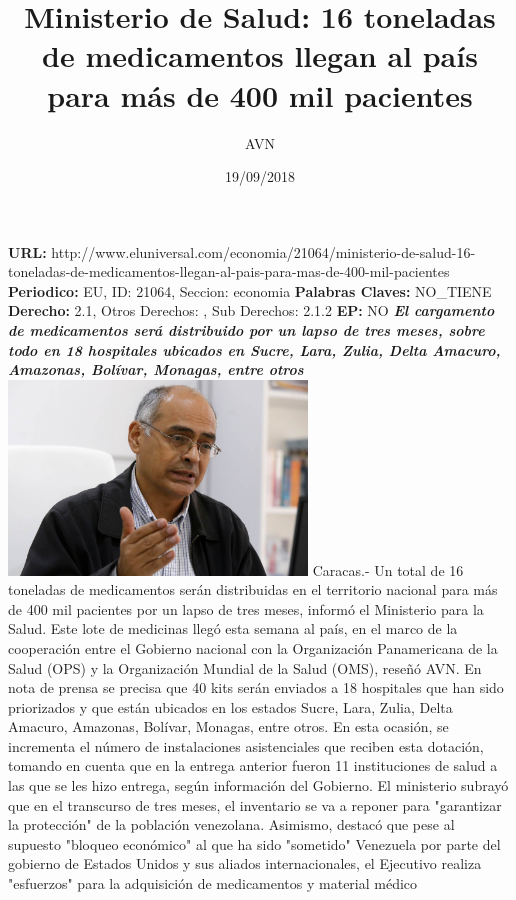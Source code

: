 \documentclass{article}%
\title{\textbf{Ministerio de Salud: 16 toneladas de medicamentos llegan al país para más de 400 mil pacientes}}%
\author{AVN}%
\date{19/09/2018}%
\begin{document}
%
\normalsize%
\maketitle%
\textbf{URL: }%
http://www.eluniversal.com/economia/21064/ministerio{-}de{-}salud{-}16{-}toneladas{-}de{-}medicamentos{-}llegan{-}al{-}pais{-}para{-}mas{-}de{-}400{-}mil{-}pacientes\newline%
%
\textbf{Periodico: }%
EU, %
ID: %
21064, %
Seccion: %
economia\newline%
%
\textbf{Palabras Claves: }%
NO\_TIENE\newline%
%
\textbf{Derecho: }%
2.1, %
Otros Derechos: %
, %
Sub Derechos: %
2.1.2\newline%
%
\textbf{EP: }%
NO\newline%
\newline%
%
\textbf{\textit{El cargamento de medicamentos será distribuido por un lapso de tres meses, sobre todo en 18 hospitales ubicados en Sucre, Lara, Zulia, Delta Amacuro, Amazonas, Bolívar, Monagas, entre otros}}%
\newline%
\newline%
%
\includegraphics[width=300px]{51.jpg}%
\newline%
%
Caracas.{-} Un total de 16 toneladas de medicamentos serán distribuidas en el territorio nacional para más de 400 mil pacientes por un lapso de tres meses, informó el Ministerio para la Salud.%
\newline%
%
Este lote de medicinas llegó esta semana al país, en el marco de la cooperación entre el Gobierno nacional con la Organización Panamericana de la Salud (OPS) y la Organización Mundial de la Salud (OMS), reseñó AVN.%
\newline%
%
En nota de prensa se precisa que 40 kits serán enviados a 18 hospitales que han sido priorizados y que están ubicados en los estados Sucre, Lara, Zulia, Delta Amacuro, Amazonas, Bolívar, Monagas, entre otros.%
\newline%
%
En esta ocasión, se incrementa el número de instalaciones asistenciales que reciben esta dotación, tomando en cuenta que en la entrega anterior fueron 11 instituciones de salud a las que se les hizo entrega, según información del Gobierno.%
\newline%
%
El ministerio subrayó que en el transcurso de tres meses, el inventario se va a reponer para "garantizar la protección" de la población venezolana.%
\newline%
%
Asimismo, destacó que pese al supuesto "bloqueo económico" al que ha sido "sometido" Venezuela por parte del gobierno de Estados Unidos y sus aliados internacionales, el Ejecutivo realiza "esfuerzos" para la adquisición de medicamentos y material médico%
\newline%
%
\end{document}
